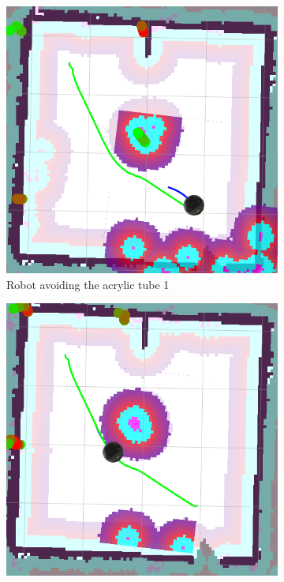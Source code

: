 \begin{figure}[ht!]
  \centering
  \begin{subfigure}[t]{0.3\linewidth}
    \includegraphics[width=\linewidth]{imgs/chapter5/glassradar1.png}
     \caption{Robot avoiding the acrylic tube 1}
     \label{fig::rvizglassradar1}
  \end{subfigure}
  \begin{subfigure}[t]{0.3\linewidth}
    \includegraphics[width=\linewidth]{imgs/chapter5/glassradar2.png}

\end{subfigure}
\end{figure}
